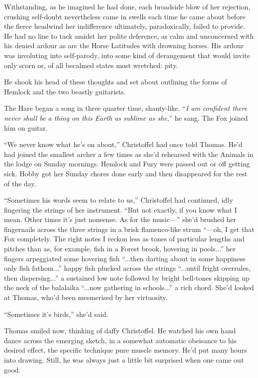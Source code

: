 \documentclass[11pt,a5paper]{article}
\begin{document}
Withstanding, as he imagined he had done, each broadside blow of her rejection, crushing self-doubt nevertheless came in swells each time he came about before the fierce headwind her indifference ultimately, paradoxically, failed to provide. He had no line to tack amidst her polite deference, as calm and unconcerned with his denied ardour as are the Horse Latitudes with drowning horses. His ardour was involuting into self-parody, into some kind of derangement that would invite only scorn or, of all becalmed states most wretched: pity.

He shook his head of these thoughts and set about outlining the forms of Hemlock and the two beastly guitarists.

The Hare began a song in three quarter time, shanty-like. ``\emph{I am confident there never shall be a thing on this Earth as sublime as she,}'' he sang. The Fox joined him on guitar.

``We never know what he's on about,'' Christoffel had once told Thomas. He'd had joined the smallest archer a few times as she'd rehearsed with the Animals in the lodge on Sunday mornings. Hemlock and Fury were passed out or off getting sick. Hobby got her Sunday chores done early and then disappeared for the rest of the day.

``Sometimes his words seem to relate to us,'' Christoffel had continued, idly fingering the strings of her instrument. ``But not exactly, if you know what I mean. Other times it's just nonsense. As for the music---'' she'd brushed her fingernails across the three strings in a brisk flamenco-like strum ``---oh, I get that Fox completely. The right notes I reckon less as tones of particular lengths and pitches than as, for example, fish in a Forest brook, hovering in pools...'' her fingers arpeggiated some hovering fish ``...then darting about in some happiness only fish fathom...'' happy fish plucked across the strings ``...until fright overrules, then dispersing...'' a sustained low note followed by bright bell-tones skipping up the neck of the balalaika ``...now gathering in schools...'' a rich chord. She'd looked at Thomas, who'd been mesmerised by her virtuosity.

``Sometimes it's birds,'' she'd said.

Thomas smiled now, thinking of daffy Christoffel. He watched his own hand dance across the emerging sketch, in a somewhat automatic obeisance to his desired effect, the specific technique pure muscle memory. He'd put many hours into drawing. Still, he was always just a little bit surprised when one came out good.
\end{document}
